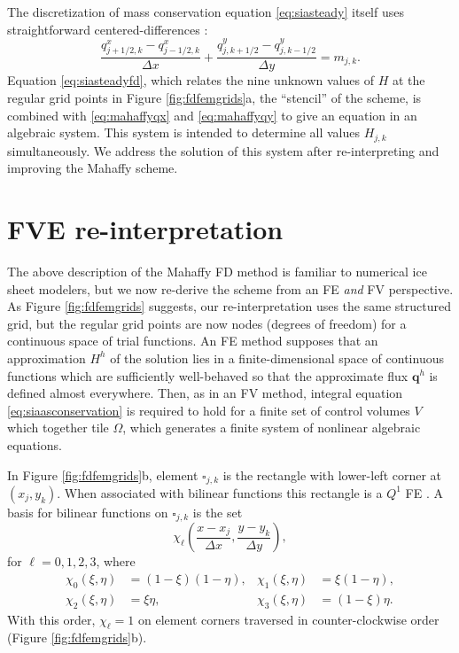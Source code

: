 \documentclass[twocolumn,letterpaper]{igs}
\newcommand\bq{\mathbf{q}}
\begin{document}
The discretization of mass conservation equation \eqref{eq:siasteady} itself uses straightforward centered-differences \citep{MortonMayers2005}:
\begin{equation}
\frac{q^x_{j+1/2,k} - q^x_{j-1/2,k}}{\Delta x} + \frac{q^y_{j,k+1/2}- q^y_{j,k-1/2}}{\Delta y} = m_{j,k}.  \label{eq:siasteadyfd}
\end{equation}
Equation \eqref{eq:siasteadyfd}, which relates the nine unknown values of $H$ at the regular grid points in Figure \ref{fig:fdfemgrids}a, the ``stencil'' of the scheme, is combined with \eqref{eq:mahaffyqx} and \eqref{eq:mahaffyqy} to give an equation in an algebraic system.  This system is intended to determine all values $H_{j,k}$ simultaneously.  We address the solution of this system after re-interpreting and improving the Mahaffy scheme.


\section{FVE re-interpretation} \label{sec:fveinterpretation}

The above description of the Mahaffy FD method is familiar to numerical ice sheet modelers, but we now re-derive the scheme from an FE \emph{and} FV perspective.  As Figure \ref{fig:fdfemgrids} suggests, our re-interpretation uses the same structured grid, but the regular grid points are now nodes (degrees of freedom) for a continuous space of trial functions.  An FE method supposes that an approximation $H^h$ of the solution lies in a finite-dimensional space of continuous functions which are sufficiently well-behaved so that the approximate flux $\bq^h$ is defined almost everywhere.  Then, as in an FV method, integral equation \eqref{eq:siaasconservation} is required to hold for a finite set of control volumes $V$ which together tile $\Omega$, which generates a finite system of nonlinear algebraic equations.

In Figure \ref{fig:fdfemgrids}b, element $\square_{j,k}$ is the rectangle with lower-left corner at $(x_j,y_k)$.  When associated with bilinear functions this rectangle is a $Q^1$ FE \citep{Elmanetal2005}.  A basis for bilinear functions on $\square_{j,k}$ is the set
\begin{equation}
\chi_\ell \left(\frac{x-x_j}{\Delta x},\frac{y-y_k}{\Delta y}\right), \label{eq:elementbasis}
\end{equation}
for $\ell=0,1,2,3$, where
\begin{align*}
\chi_0(\xi,\eta) &= \left(1-\xi\right) \left(1-\eta\right), & \chi_1(\xi,\eta) &= \xi \left(1-\eta\right), \\
\chi_2(\xi,\eta) &= \xi \eta, & \chi_3(\xi,\eta) &= \left(1-\xi\right) \eta.
\end{align*}
With this order, $\chi_\ell=1$ on element corners traversed in counter-clockwise order (Figure \ref{fig:fdfemgrids}b).  
\end{document}
